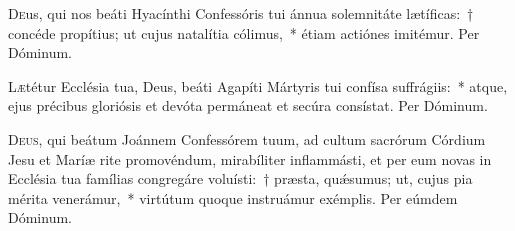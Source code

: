 \documentclass[vesperale_romanum.tex]{subfiles}
\begin{document}
\commemoration

\myrule
\newpage

\duplexmtv


\oratio

\lettrine{D}{e}us, qui nos beáti Hyacínthi Confessóris tui ánnua solemnitáte lætíficas:~† concéde propítius; ut cujus natalítia cólimus,~* étiam actiónes imitémur. Per Dóminum.


\myrule


\semiduplex



\oratio
\lettrine{L}{æ}tétur Ecclésia tua, Deus, beáti Agapíti Mártyris tui confísa suffrágiis:~* atque, ejus précibus gloriósis et devóta permáneat et secúra consístat. Per Dóminum.


\myrule

\duplex
\oratio

\lettrine{D}{eus}, qui beátum Joánnem Confessórem tuum, ad cultum sacrórum Córdium Jesu et Maríæ rite promovéndum, mirabíliter inflammásti, et per eum novas in Ecclésia tua famílias congregáre voluísti:~† præsta, quǽsumus; ut, cujus pia mérita venerámur,~* virtútum quoque instruámur exémplis.
Per eúmdem Dóminum.


\myrule

\newpage

\duplex


\oratio
\end{document}
